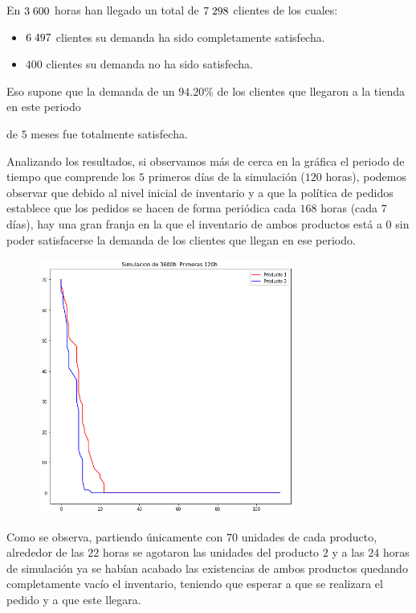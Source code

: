 \documentclass[a4paper,12pt]{article}
\begin{document}
	
	En $3\hspace{1mm}600$ horas han llegado un total de $7\hspace{1mm}298$ clientes de los cuales:
	
	\begin{itemize}
		\item $6\hspace{1mm}497$ clientes su demanda ha sido completamente satisfecha.
		\item $400$ clientes su demanda no ha sido satisfecha.
	\end{itemize}

	Eso supone que la demanda de un $94.20\%$ de los clientes que llegaron a la tienda en este periodo

	de $5$ meses fue totalmente satisfecha.
	
	Analizando los resultados, si observamos más de cerca en la gráfica el periodo de tiempo que
comprende los $5$ primeros días de la simulación ($120$ horas), podemos observar que debido al
nivel inicial de inventario y a que la política de pedidos establece que los pedidos se hacen de
forma periódica cada $168$ horas (cada $7$ días), hay una gran franja en la que el inventario de ambos
productos está a $0$ sin poder satisfacerse la demanda de los clientes que llegan en ese periodo.
	
	\begin{figure}[H]
		\centering
		\includegraphics[width=0.75\textwidth]{include/simulacion_5d.png}
	\end{figure}
	
	Como se observa, partiendo únicamente con $70$ unidades de cada producto, alrededor de las $22$ 	horas se agotaron las unidades del producto $2$ y a las $24$ horas de simulación ya se habían acabado las existencias de ambos productos quedando completamente vacío el inventario, teniendo que	esperar a que se realizara el pedido y a que este llegara.
\end{document}
